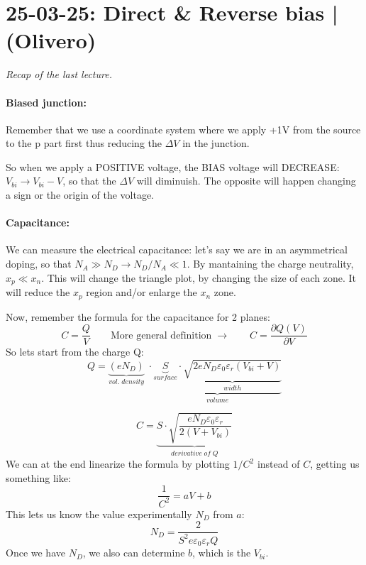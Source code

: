 \section{25-03-25: Direct \& Reverse bias | (Olivero)}

\textit{Recap of the last lecture.}

\paragraph{Biased junction:} Remember that we use a coordinate system where we apply +1V from the source to the p part first thus reducing the $\Delta V$ in the junction.

So when we apply a POSITIVE voltage, the BIAS voltage will DECREASE: $V_{bi} \rightarrow V_{bi} - V$, so that the $\Delta V$ will diminuish. The opposite will happen changing a sign or the origin of the voltage.

\paragraph{Capacitance:} We can measure the electrical capacitance: let's say we are in an asymmetrical doping, so that $N_A \gg N_D \rightarrow N_D / N_A \ll 1$. By mantaining the charge neutrality, $x_p \ll x_n$. This will change the triangle plot, by changing the size of each zone. It will reduce the $x_p$ region and/or enlarge the $x_n$ zone.

Now, remember the formula for the capacitance for 2 planes:
\begin{equation}
    C = \frac{Q}{V} \qquad \text{More general definition} \; \rightarrow \qquad C = \frac{\partial Q(V)}{\partial V}  
\end{equation}
So lets start from the charge Q:
\begin{equation}
    Q = \underbrace{(eN_D)}_{vol. \; density} \;\cdot \underbrace{\underbrace{S}_{surface} \cdot \underbrace{\sqrt{2eN_D \varepsilon_0\varepsilon_r ( V_{bi} + V)}}_{width}}_{volume}
\end{equation}

\begin{equation}
    C = \underbrace{S \cdot \sqrt{\frac{eN_D\varepsilon_0\varepsilon_r}{2(V + V_{bi})}}}_{derivative\;of\;Q}
\end{equation}
We can at the end linearize the formula by plotting $1/C^2$ instead of $C$, getting us something like:
\begin{equation}
    \frac{1}{C^2} = aV + b
\end{equation}
This lets us know the value experimentally $N_D$ from $a$:
\begin{equation}
    N_D = \frac{2}{S^2e\varepsilon_0\varepsilon_rQ}
\end{equation}
Once we have $N_D$, we also can determine $b$, which is the $V_{bi}$.

